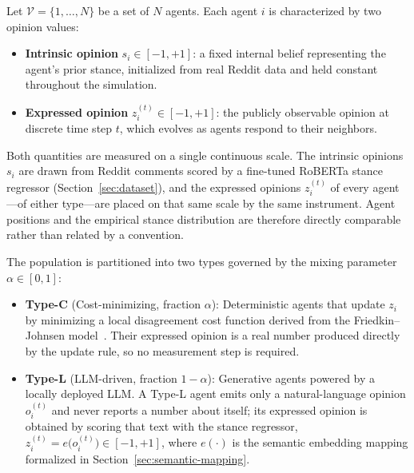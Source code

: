 %

Let $\mathcal{V} = \{1, \ldots, N\}$ be a set of $N$ agents. Each agent $i$ is characterized by two opinion values:
\begin{itemize}
    \item \textbf{Intrinsic opinion} $s_i \in [-1, +1]$: a fixed internal belief representing the agent's prior stance, initialized from real Reddit data and held constant throughout the simulation.
    \item \textbf{Expressed opinion} $z_i^{(t)} \in [-1, +1]$: the publicly observable opinion at discrete time step $t$, which evolves as agents respond to their neighbors.
\end{itemize}

\textcolor{revgreen}{Both quantities are measured on a single continuous scale. The intrinsic
opinions $s_i$ are drawn from Reddit comments scored by a fine-tuned RoBERTa stance
regressor (Section~\ref{sec:dataset}), and the expressed opinions $z_i^{(t)}$ of every
agent---of either type---are placed on that same scale by the same instrument. Agent
positions and the empirical stance distribution are therefore directly comparable
rather than related by a convention.}

The population is partitioned into two types governed by the mixing parameter $\alpha \in [0,1]$:
\begin{itemize}
    \item \textbf{Type-C} (Cost-minimizing, fraction $\alpha$): Deterministic agents that update $z_i$ by minimizing a local disagreement cost function derived from the Friedkin--Johnsen model~\cite{friedkin1990}. \textcolor{revgreen}{Their expressed opinion is a real number produced directly by the update rule, so no measurement step is required.}
    \item \textbf{Type-L} (LLM-driven, fraction $1 - \alpha$): Generative agents powered by a locally deployed LLM\textcolor{revgreen}{. A Type-L agent emits only a natural-language opinion $o_i^{(t)}$ and never reports a number about itself; its expressed opinion is obtained by scoring that text with the stance regressor, $z_i^{(t)} = e\bigl(o_i^{(t)}\bigr) \in [-1,+1]$, where $e(\cdot)$ is the semantic embedding mapping formalized in Section~\ref{sec:semantic-mapping}}.
\end{itemize}

